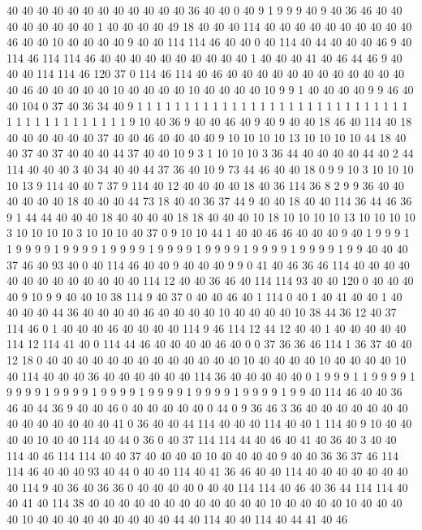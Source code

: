 40 40 40 40 40 40 40 40 40 40 40 40 36 40 40 0 40 9 1 9
9 9 40 9 40 36 46 40 40 40 40 40 40 40 40 1 40 40 40 40
49 18 40 40 40 114 40 40 40 40 40 40 40 40 40 40 46 40 40 10
40 40 40 40 9 40 40 114 114 46 40 40 0 40 114 40 44 40 40 40
46 9 40 114 46 114 114 46 40 40 40 40 40 40 40 40 40 40 1 40
40 40 41 40 46 44 46 9 40 40 40 114 114 46 120 37 0 114 46 114
40 46 40 40 40 40 40 40 40 40 40 40 40 40 40 46 40 40 40 40
40 10 40 40 40 40 10 40 40 40 40 10 9 9 1 40 40 40 40 9
9 46 40 40 104 0 37 40 36 34 40 9 1 1 1 1 1 1 1 1
1 1 1 1 1 1 1 1 1 1 1 1 1 1 1 1 1 1 1 1
1 1 1 1 1 1 1 1 1 1 1 1 1 1 9 10 40 36 9 40
40 46 40 9 40 9 40 40 18 46 40 114 40 18 40 40 40 40 40 40
37 40 40 46 40 40 40 40 9 10 10 10 10 13 10 10 10 10 44 18
40 40 37 40 37 40 40 40 44 37 40 40 10 9 3 1 10 10 10 3
36 44 40 40 40 40 44 40 2 44 114 40 40 40 3 40 34 40 40 44
37 36 40 10 9 73 44 46 40 40 18 0 9 9 10 3 10 10 10 10
13 9 114 40 40 7 37 9 114 40 12 40 40 40 40 18 40 36 114 36
8 2 9 9 36 40 40 40 40 40 40 18 40 40 40 44 73 18 40 40
36 37 44 9 40 40 18 40 40 114 36 44 46 36 9 1 44 44 40 40
40 18 40 40 40 40 18 18 40 40 40 10 18 10 10 10 10 13 10 10
10 10 3 10 10 10 10 3 10 10 10 40 37 0 9 10 10 44 1 40
40 46 46 40 40 40 9 40 1 9 9 9 1 1 9 9 9 9 1 9
9 9 9 1 9 9 9 9 1 9 9 9 9 1 9 9 9 9 1 9
9 9 9 1 9 9 9 9 1 9 9 40 40 40 37 46 40 93 40 0
40 114 46 40 40 9 40 40 40 9 9 0 41 40 46 36 46 114 40 40
40 40 40 40 40 40 40 40 40 40 40 114 12 40 40 36 46 40 114 114
93 40 40 120 0 40 40 40 40 9 10 9 9 40 40 10 38 114 9 40
37 0 40 40 46 40 1 114 0 40 1 40 41 40 40 1 40 40 40 40
44 36 40 40 40 40 46 40 40 40 40 10 40 40 40 40 10 38 44 36
12 40 37 114 46 0 1 40 40 40 46 40 40 40 40 114 9 46 114 12
44 12 40 40 1 40 40 40 40 40 114 12 114 41 40 0 114 44 46 40
40 40 40 46 40 0 0 37 36 36 46 114 1 36 37 40 40 12 18 0
40 40 40 40 40 40 40 40 40 40 40 40 40 10 40 40 40 40 10 40
40 40 40 10 40 114 40 40 40 36 40 40 40 40 40 40 114 36 40 40
40 40 40 0 1 9 9 9 1 1 9 9 9 9 1 9 9 9 9 1
9 9 9 9 1 9 9 9 9 1 9 9 9 9 1 9 9 9 9 1
9 9 9 9 1 9 9 40 114 46 40 40 36 46 40 44 36 9 40 40
46 0 40 40 40 40 40 0 44 0 9 36 46 3 36 40 40 40 40 40
40 40 40 40 40 40 40 40 40 41 0 36 40 40 44 114 40 40 40 114
40 40 1 114 40 9 10 40 40 40 40 10 40 40 114 40 44 0 36 0
40 37 114 114 44 40 46 40 41 40 36 40 3 40 40 114 40 46 114 114
40 40 37 40 40 40 40 10 40 40 40 40 9 40 40 36 36 37 46 114
114 46 40 40 40 93 40 44 0 40 40 114 40 41 36 46 40 40 114 40
40 40 40 40 40 40 40 114 9 40 36 40 36 36 0 40 40 40 40 0
40 40 114 114 40 46 40 36 44 114 114 40 40 41 40 114 38 40 40 40
40 40 40 40 40 40 40 40 40 10 40 40 40 40 10 40 40 40 40 10
40 40 40 40 40 40 40 40 40 44 40 114 40 40 114 40 44 41 40 46
